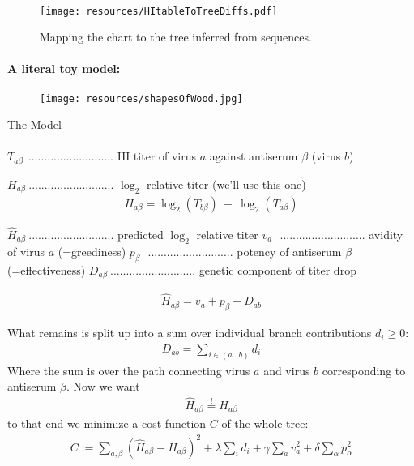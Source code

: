 \documentclass{beamer}
\begin{document}
\begin{darkframes}
\begin{frame}{\subsecname}
    \end{frame}

    \begin{frame}{\subsecname}
      \framesubtitle{}
      \begin{figure}
        \texttt{[image: resources/HItableToTreeDiffs.pdf]}
        \caption{\footnotesize Mapping the chart to the tree inferred from sequences. \cite{bedford15}}
      \end{figure}
    \end{frame}


    \begin{frame}{\subsecname}
      \framesubtitle{\small A literal toy model:}
      \begin{figure}
        \texttt{[image: resources/shapesOfWood.jpg]}
        \caption{\footnotesize \cite{rosipaw10}}
      \end{figure}
    \end{frame}

    \begin{frame}[allowframebreaks]{The Model --- \cite{neherBedford+16} ---}
      \framesubtitle{}
      $T_{a\beta}~\ $........................... HI titer of virus $a$ against antiserum $\beta$ (virus $b$)

      $H_{a\beta}~$........................... $\log_2$ relative titer (we'll use this one)
      \begin{align}
        H_{a\beta} = \log_2 (T_{b\beta}) ~ - ~\log_2 ( T_{a\beta})
      \end{align}

      $\hat{H}_{a\beta}~$........................... predicted $\log_2$ relative titer
      $v_{a}~~~$........................... avidity of virus $a$ (=greediness)
      $p_{\beta}~~~$........................... potency of antiserum $\beta$ (=effectiveness)
      $D_{a\beta}~$........................... genetic component of titer drop

      \begin{align}
        \hat{H}_{a\beta} = v_a + p_\beta + D_{ab}
      \end{align}


      What remains is split up into a sum over individual branch contributions $d_i \ge 0$:
      \begin{align}
        D_{ab} = \sum_{i \in (a ... b)} d_i
      \end{align}
      Where the sum is over the path connecting virus $a$ and virus $ b $ corresponding to antiserum $\beta$. Now we want
      \begin{align}
        \hat{H}_{a\beta} \stackrel{!}={} {H}_{a\beta}
      \end{align}
      to that end we minimize a cost function $C$ of the whole tree:
      \begin{align}
        C := \sum_{a,\beta}( \hat{H}_{a\beta} - {H}_{a\beta})^2 + \lambda \sum_i d_i + \gamma \sum_a v_a^2 + \delta \sum_\alpha p_\alpha^2
      \end{align}


\end{frame}
\end{darkframes}
\end{document}
